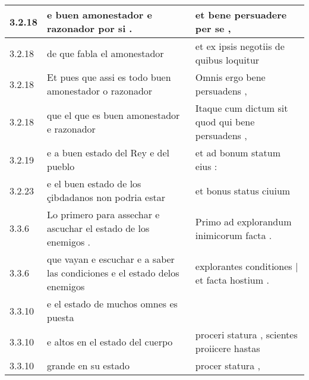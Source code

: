 \begin{tabular}{|p{1cm}|p{6.5cm}|p{6.5cm}|}
3.2.18 & e buen amonestador e razonador por si . & et bene persuadere per se , \\\hline
3.2.18 & de que fabla el amonestador & et ex ipsis negotiis de quibus loquitur \\\hline
3.2.18 & Et pues que assi es todo buen amonestador o razonador & Omnis ergo bene persuadens , \\\hline
3.2.18 & que el que es buen amonestador e razonador & Itaque cum dictum sit quod qui bene persuadens , \\\hline
3.2.19 & e a buen estado del Rey e del pueblo & et ad bonum statum eius : \\\hline
3.2.23 & e el buen estado de los çibdadanos non podria estar & et bonus status ciuium \\\hline
3.3.6 & Lo primero para assechar e ascuchar el estado de los enemigos . & Primo ad explorandum inimicorum facta . \\\hline
3.3.6 & que vayan e escuchar e a saber las condiciones e el estado delos enemigos & explorantes conditiones | et facta hostium . \\\hline
3.3.10 & e el estado de muchos omnes es puesta &  \\\hline
3.3.10 & e altos en el estado del cuerpo & proceri statura , scientes proiicere hastas \\\hline
3.3.10 & grande en su estado & procer statura , \\\hline

\end{tabular}
